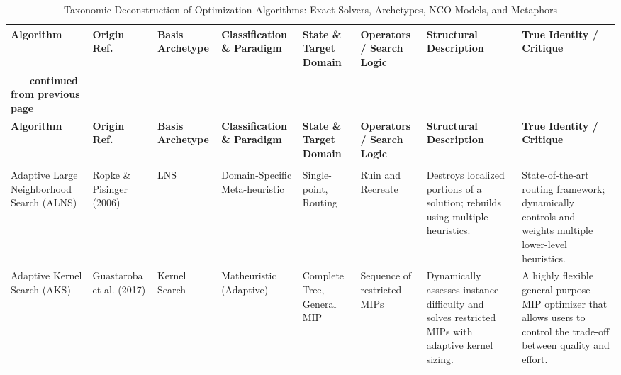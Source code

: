 \documentclass[10pt, a4paper]{article}
\begin{document}
\begin{center}
\scriptsize
\renewcommand{\arraystretch}{1.5}
\begin{longtable}{
  >{\raggedright\arraybackslash}p{2.3cm}
  >{\raggedright\arraybackslash}p{2.3cm}
  >{\raggedright\arraybackslash}p{2.2cm}
  >{\raggedright\arraybackslash}p{2.4cm}
  >{\raggedright\arraybackslash}p{2.0cm}
  >{\raggedright\arraybackslash}p{2.4cm}
  >{\raggedright\arraybackslash}p{5.5cm}
  >{\raggedright\arraybackslash}p{5.5cm}
}
\caption{Taxonomic Deconstruction of Optimization Algorithms: Exact Solvers, Archetypes, NCO Models, and Metaphors} \label{tab:full_taxonomy} \\
\toprule
\textbf{Algorithm} & \textbf{Origin Ref.} & \textbf{Basis Archetype} & \textbf{Classification \& Paradigm} & \textbf{State \& Target Domain} & \textbf{Operators / Search Logic} & \textbf{Structural Description} & \textbf{True Identity / Critique} \\
\midrule
\endfirsthead

\multicolumn{8}{c}%
{{\bfseries \tablename\ \thetable{} -- continued from previous page}} \\
\toprule
\textbf{Algorithm} & \textbf{Origin Ref.} & \textbf{Basis Archetype} & \textbf{Classification \& Paradigm} & \textbf{State \& Target Domain} & \textbf{Operators / Search Logic} & \textbf{Structural Description} & \textbf{True Identity / Critique} \\
\midrule
\endhead

\midrule \multicolumn{8}{r}{{Continued on next page}} \\
\endfoot

\bottomrule
\endlastfoot

Adaptive Large Neighborhood Search (ALNS) & Ropke \& Pisinger (2006) & LNS & Domain-Specific Meta-heuristic & Single-point, Routing & Ruin and Recreate & Destroys localized portions of a solution; rebuilds using multiple heuristics. & State-of-the-art routing framework; dynamically controls and weights multiple lower-level heuristics. \\ \midrule

Adaptive Kernel Search (AKS) & Guastaroba et al. (2017) & Kernel Search & Matheuristic (Adaptive) & Complete Tree, General MIP & Sequence of restricted MIPs & Dynamically assesses instance difficulty and solves restricted MIPs with adaptive kernel sizing. & A highly flexible general-purpose MIP optimizer that allows users to control the trade-off between quality and effort. \\ \midrule


\end{longtable}
\end{center}
\end{document}
